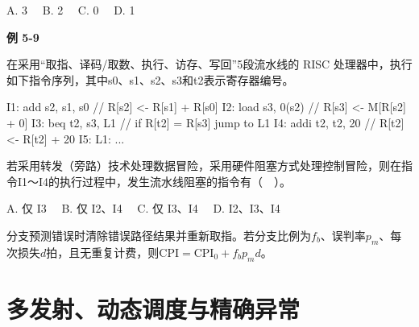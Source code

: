 A. 3　 B. 2　 C. 0　 D. 1

\par\medskip{}\noindent\hypertarget{CO05-E09}{}\label{CO05-E09}\textbf{例 5-9}\par\nobreak\smallskip

在采用``取指、译码/取数、执行、访存、写回''5段流水线的 RISC 处理器中，执行如下指令序列，其中s0、s1、s2、s3和t2表示寄存器编号。

\par\smallskip\noindent\begin{minipage}{\linewidth}
\begin{codeblock}[language={}]
I1: add  s2, s1, s0  // R[s2] <- R[s1] + R[s0]
I2: load s3, 0(s2)   // R[s3] <- M[R[s2] + 0]
I3: beq  t2, s3, L1  // if R[t2] = R[s3] jump to L1
I4: addi t2, t2, 20  // R[t2] <- R[t2] + 20
I5: L1: ...
\end{codeblock}
\end{minipage}\par\smallskip

若采用转发（旁路）技术处理数据冒险，采用硬件阻塞方式处理控制冒险，则在指令I1～I4的执行过程中，发生流水线阻塞的指令有（　）。

A. 仅 I3　 B. 仅 I2、I4　 C. 仅 I3、I4　 D. I2、I3、I4

分支预测错误时清除错误路径结果并重新取指。若分支比例为\(f_b\)、误判率\(p_m\)、每次损失\(d\)拍，且无重复计费，则\(\mathrm{CPI}=\mathrm{CPI}_0+f_bp_md\)。

\section{多发射、动态调度与精确异常}\label{CO05-parallel}

